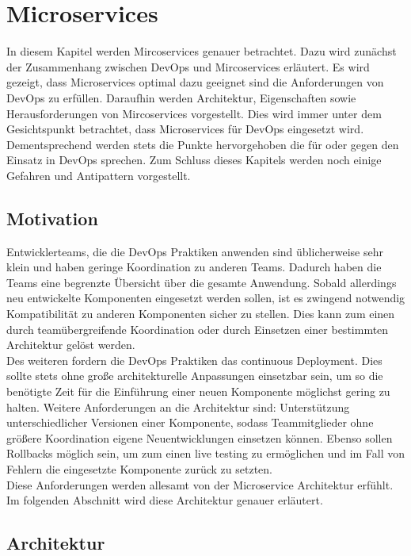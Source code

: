 \chapter{Microservices}
In diesem Kapitel werden Mircoservices genauer betrachtet. Dazu wird zunächst der Zusammenhang zwischen DevOps und Mircoservices erläutert. Es wird gezeigt, dass Microservices optimal dazu geeignet sind die Anforderungen von DevOps zu erfüllen. Daraufhin werden Architektur, Eigenschaften sowie Herausforderungen von Mircoservices vorgestellt. Dies wird immer unter dem Gesichtspunkt betrachtet, dass Microservices für DevOps eingesetzt wird. Dementsprechend werden stets die Punkte hervorgehoben die für oder gegen den Einsatz in DevOps sprechen. Zum Schluss dieses Kapitels werden noch einige Gefahren und Antipattern vorgestellt.

\section{Motivation}

Entwicklerteams, die die DevOps Praktiken anwenden sind üblicherweise sehr klein und haben geringe Koordination zu anderen Teams. Dadurch haben die Teams eine begrenzte Übersicht über die gesamte Anwendung. Sobald allerdings neu entwickelte Komponenten eingesetzt werden sollen, ist es zwingend notwendig Kompatibilität zu anderen Komponenten sicher zu stellen. Dies kann zum einen durch teamübergreifende Koordination oder durch Einsetzen einer bestimmten Architektur gelöst werden. \\
Des weiteren fordern die DevOps Praktiken das continuous Deployment. Dies sollte stets ohne große architekturelle Anpassungen einsetzbar sein, um so die benötigte Zeit für die Einführung einer neuen Komponente möglichst gering zu halten. Weitere Anforderungen an die Architektur sind: Unterstützung unterschiedlicher Versionen einer Komponente, sodass Teammitglieder ohne größere Koordination eigene Neuentwicklungen einsetzen können. Ebenso sollen Rollbacks möglich sein, um zum einen live testing zu ermöglichen und im Fall von Fehlern die eingesetzte Komponente zurück zu setzten.\\

Diese Anforderungen werden allesamt von der Microservice Architektur erfühlt. Im folgenden Abschnitt wird diese Architektur genauer erläutert. 
 


\section{Architektur}


